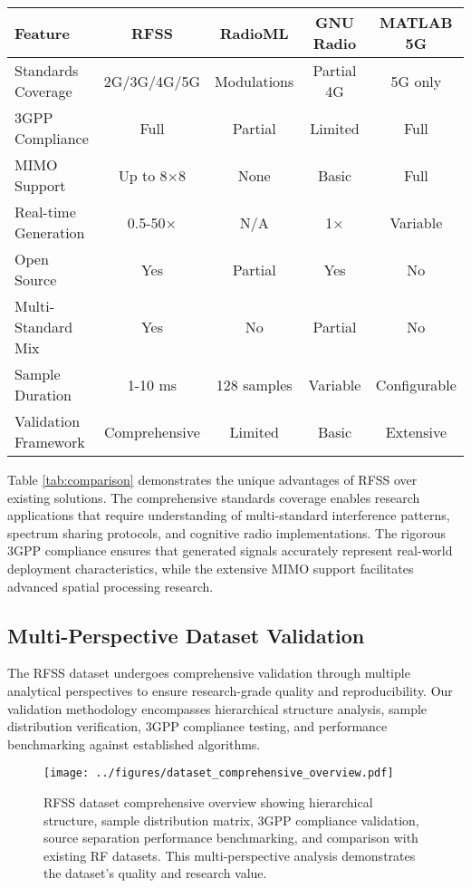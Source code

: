 \documentclass[twocolumn]{article}
\begin{document}
\begin{table*}[t]
\centering
\caption{Comprehensive Dataset Comparison}
\label{tab:comparison}
\begin{tabular}{|l|c|c|c|c|}
\hline
\textbf{Feature} & \textbf{RFSS} & \textbf{RadioML} & \textbf{GNU Radio} & \textbf{MATLAB 5G} \\
\hline
Standards Coverage & 2G/3G/4G/5G & Modulations & Partial 4G & 5G only \\
\hline
3GPP Compliance & Full & Partial & Limited & Full \\
\hline
MIMO Support & Up to 8×8 & None & Basic & Full \\
\hline
Real-time Generation & 0.5-50× & N/A & 1× & Variable \\
\hline
Open Source & Yes & Partial & Yes & No \\
\hline
Multi-Standard Mix & Yes & No & Partial & No \\
\hline
Sample Duration & 1-10 ms & 128 samples & Variable & Configurable \\
\hline
Validation Framework & Comprehensive & Limited & Basic & Extensive \\
\hline
\end{tabular}
\end{table*}

Table \ref{tab:comparison} demonstrates the unique advantages of RFSS over existing solutions. The comprehensive standards coverage enables research applications that require understanding of multi-standard interference patterns, spectrum sharing protocols, and cognitive radio implementations. The rigorous 3GPP compliance ensures that generated signals accurately represent real-world deployment characteristics, while the extensive MIMO support facilitates advanced spatial processing research.

\subsection{Multi-Perspective Dataset Validation}

The RFSS dataset undergoes comprehensive validation through multiple analytical perspectives to ensure research-grade quality and reproducibility. Our validation methodology encompasses hierarchical structure analysis, sample distribution verification, 3GPP compliance testing, and performance benchmarking against established algorithms.

\begin{figure}[h]
\centering
\texttt{[image: ../figures/dataset\_comprehensive\_overview.pdf]}
\caption{RFSS dataset comprehensive overview showing hierarchical structure, sample distribution matrix, 3GPP compliance validation, source separation performance benchmarking, and comparison with existing RF datasets. This multi-perspective analysis demonstrates the dataset's quality and research value.}
\label{fig:dataset_overview}
\end{figure}
\end{document}
